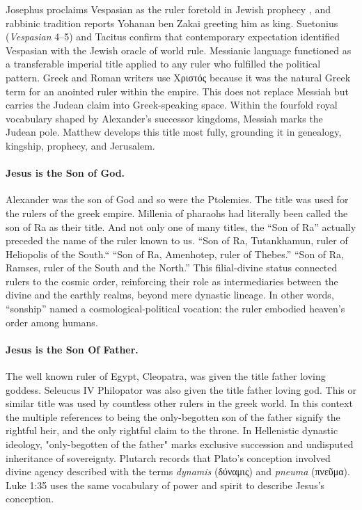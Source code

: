 Josephus proclaims Vespasian as the ruler foretold in Jewish prophecy \cite[3.8.9]{josephus:war}, and rabbinic tradition reports Yohanan ben Zakai greeting him as king.
Suetonius (\emph{Vespasian} 4--5) and Tacitus \cite[5.13]{tacitus:histories} confirm that contemporary expectation identified Vespasian with the Jewish oracle of world rule.
Messianic language functioned as a transferable imperial title applied to any ruler who fulfilled the political pattern.
Greek and Roman writers use Χριστός because it was the natural Greek term for an anointed ruler within the empire.
This does not replace Messiah but carries the Judean claim into Greek-speaking space.
Within the fourfold royal vocabulary shaped by Alexander's successor kingdoms, Messiah marks the Judean pole.
Matthew develops this title most fully, grounding it in genealogy, kingship, prophecy, and Jerusalem.

\paragraph{Jesus is the Son of God.}\label{par:jesus-is-the-son-of-god.}
Alexander was the son of God and so were the Ptolemies.
The title was used for the rulers of the greek empire.
Millenia of pharaohs had literally been called the son of Ra as their title.
And not only one of many titles, the ``Son of Ra'' actually preceded the name of the ruler known to us.
“Son of Ra, Tutankhamun, ruler of Heliopolis of the South.``
``Son of Ra, Amenhotep, ruler of Thebes.''
``Son of Ra, Ramses, ruler of the South and the North.''
This filial-divine status connected rulers to the cosmic order, reinforcing their role as intermediaries between the divine and the earthly realms, beyond mere dynastic lineage.
In other words, “sonship” named a cosmological-political vocation: the ruler embodied heaven’s order among humans.

\paragraph{Jesus is the Son Of Father.}\label{par:jesus-is-the-son-of-father.}

The well known ruler of Egypt, Cleopatra, was given the title father loving goddess.
Seleucus IV Philopator was also given the title father loving god.
This or similar title was used by countless other rulers in the greek world.
In this context the multiple references to being the only-begotten son of the father signify the rightful heir, and the only rightful claim to the throne.
In Hellenistic dynastic ideology, "only-begotten of the father" marks exclusive succession and undisputed inheritance of sovereignty.
Plutarch records that Plato's conception involved divine agency described with the terms \emph{dynamis} (δύναμις) and \emph{pneuma} (πνεῦμα).
Luke 1:35 uses the same vocabulary of power and spirit to describe Jesus's conception.


